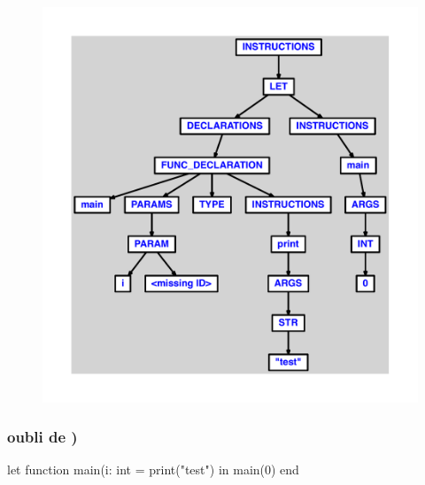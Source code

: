 \documentclass{article}
\begin{document}
\begin{figure}[H]\centering\includegraphics[max width=\textwidth]{ast/ast_210.pdf}\end{figure}\subsubsection{oubli de )}
\begin{verbatimtab}
let
	function main(i: int = print("test")
in main(0) end
\end{verbatimtab}
\end{document}
